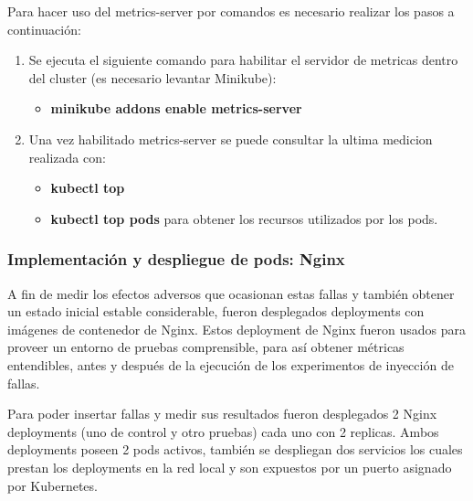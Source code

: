 \par Para hacer uso del metrics-server por comandos es necesario realizar los pasos a continuación:
\begin{enumerate}
    \item Se ejecuta el siguiente comando para habilitar el servidor de metricas dentro del cluster (es necesario levantar Minikube):
    \begin{itemize}
        \item \textbf{minikube addons enable metrics-server}
    \end{itemize}
    \item Una vez habilitado metrics-server se puede consultar la ultima medicion realizada con:
    \begin{itemize}
        \item \textbf{kubectl top}
        \item \textbf{kubectl top pods} para obtener los recursos utilizados por los pods.
    \end{itemize}
\end{enumerate}

\subsubsection{Implementación y despliegue de pods: Nginx}

\par A fin de medir los efectos adversos que ocasionan estas fallas y también obtener un estado inicial estable considerable, fueron desplegados deployments con imágenes de contenedor de Nginx. Estos deployment de Nginx fueron usados para proveer un entorno de pruebas comprensible, para así obtener métricas entendibles, antes y después de la ejecución de los experimentos de inyección de fallas.\\

\par Para poder insertar fallas y medir sus resultados fueron desplegados 2 Nginx deployments (uno de control y otro pruebas) cada uno con 2 replicas. Ambos deployments poseen 2 pods activos, también se despliegan dos servicios los cuales prestan los deployments en la red local y son expuestos por un puerto asignado por Kubernetes. 


